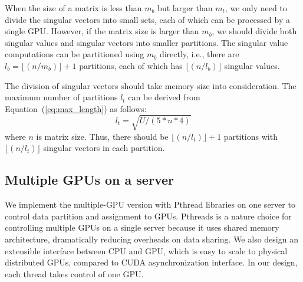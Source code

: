When the size of a matrix is less than $m_b$ but larger than $m_t$,
we only need to divide the singular vectors into small sets, each of which can be processed by a single GPU.
However, if the matrix size is larger than $m_b$, we should divide both singular values and singular vectors into smaller partitions.
The singular value computations can be partitioned using $m_b$ directly, i.e., there are $l_b = \lfloor(n/m_b)\rfloor + 1$ partitions, each of which has $\lfloor(n/l_b)\rfloor$ singular values.

The division of singular vectors should take memory size into consideration.
The maximum number of partitions $l_t$ can be derived from Equation~(\ref{eq:max_length}) as follows:
\begin{equation}
l_t = \sqrt{U/(5 * n * 4)}
\label{eq:max_length}
\end{equation}
where $n$ is matrix size.
Thus, there should be $\lfloor(n/l_t)\rfloor+1$ partitions with
$\lfloor(n/l_t)\rfloor$ singular vectors in each partition.


\subsection{Multiple GPUs on a server}
\label{sec_mgpu}
We implement the multiple-GPU version with Pthread libraries on one server
to control data partition and assignment to GPUs.
Pthreads is a nature choice for controlling multiple GPUs on a single server
because it uses shared memory architecture, dramatically reducing overheads
on data sharing. We also design an extensible interface between CPU and GPU,
 which is easy to scale to physical distributed GPUs, compared to CUDA asynchronization interface. In our design, each thread takes control of one GPU.

